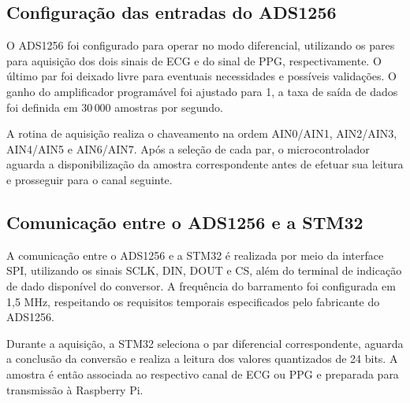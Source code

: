 \documentclass[a4paper,12pt]{fcte}
\begin{document}

\subsection{Configuração das entradas do ADS1256}
\label{subsec:configuracao_ads1256}

O ADS1256 foi configurado para operar no modo diferencial, utilizando os pares para aquisição dos dois sinais de ECG e do sinal de PPG, respectivamente. O último par foi deixado livre para eventuais necessidades e possíveis validações. O ganho do amplificador programável foi ajustado para 1, a taxa de saída de dados foi definida em $30\,000$ amostras por segundo.


A rotina de aquisição realiza o chaveamento na ordem AIN0/AIN1, AIN2/AIN3, AIN4/AIN5 e AIN6/AIN7. Após a seleção de cada par, o microcontrolador aguarda a disponibilização da amostra correspondente antes de efetuar sua leitura e prosseguir para o canal seguinte.


\subsection{Comunicação entre o ADS1256 e a STM32}
\label{subsec:comunicacao_ads_stm32}

A comunicação entre o ADS1256 e a STM32 é realizada por meio da interface SPI, utilizando os sinais SCLK, DIN, DOUT e CS, além do terminal de indicação de dado disponível do conversor. A frequência do barramento foi configurada em 1,5 MHz, respeitando os requisitos temporais especificados pelo fabricante do ADS1256.

Durante a aquisição, a STM32 seleciona o par diferencial correspondente, aguarda a conclusão da conversão e realiza a leitura dos valores quantizados de 24 bits. A amostra é então associada ao respectivo canal de ECG ou PPG e preparada para transmissão à Raspberry Pi.
\end{document}
